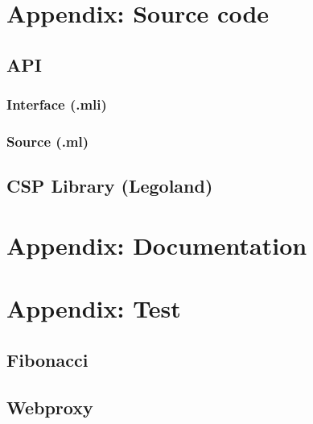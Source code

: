 \documentclass[a4paper,12pt]{article}
\begin{document}
\appendix
\newpage
\section{Appendix: Source code}
\label{appendixSrc}

\scriptsize
\subsection{API}
\label{appendixAPI}
\subsubsection{Interface (.mli)}

\subsubsection{Source (.ml)}

\subsection{CSP Library (Legoland)}

\normalsize

\newpage
\section{Appendix: Documentation}
\label{appendixDoc}
\begin{center}
  
\end{center}


\newpage
\section{Appendix: Test}
\label{appendixTest}
\scriptsize
\subsection{Fibonacci}


\subsection{Webproxy}

\normalsize
\end{document}
